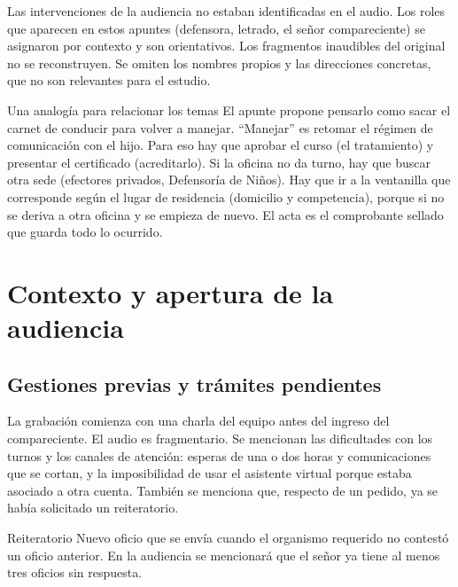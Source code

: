 \documentclass[12pt,oneside]{book}
\begin{document}
\begin{note}
Las intervenciones de la audiencia no estaban identificadas en el audio. Los roles que aparecen en estos apuntes (defensora, letrado, el se\~nor compareciente) se asignaron por contexto y son orientativos. Los fragmentos inaudibles del original no se reconstruyen. Se omiten los nombres propios y las direcciones concretas, que no son relevantes para el estudio.
\end{note}

\begin{example}{Una analog\'ia para relacionar los temas}
El apunte propone pensarlo como sacar el carnet de conducir para volver a manejar. ``Manejar'' es retomar el r\'egimen de comunicaci\'on con el hijo. Para eso hay que aprobar el curso (el tratamiento) y presentar el certificado (acreditarlo). Si la oficina no da turno, hay que buscar otra sede (efectores privados, Defensor\'ia de Ni\~nos). Hay que ir a la ventanilla que corresponde seg\'un el lugar de residencia (domicilio y competencia), porque si no se deriva a otra oficina y se empieza de nuevo. El acta es el comprobante sellado que guarda todo lo ocurrido.
\end{example}

\chapter[Contexto y apertura]{Contexto y apertura de la audiencia}

\section{Gestiones previas y tr\'amites pendientes}

La grabaci\'on comienza con una charla del equipo antes del ingreso del compareciente. El audio es fragmentario. Se mencionan las dificultades con los turnos y los canales de atenci\'on: esperas de una o dos horas y comunicaciones que se cortan, y la imposibilidad de usar el asistente virtual porque estaba asociado a otra cuenta. Tambi\'en se menciona que, respecto de un pedido, ya se hab\'ia solicitado un reiteratorio.

\begin{definition}{Reiteratorio}
Nuevo oficio que se env\'ia cuando el organismo requerido no contest\'o un oficio anterior. En la audiencia se mencionar\'a que el se\~nor ya tiene al menos tres oficios sin respuesta.
\end{definition}
\end{document}

